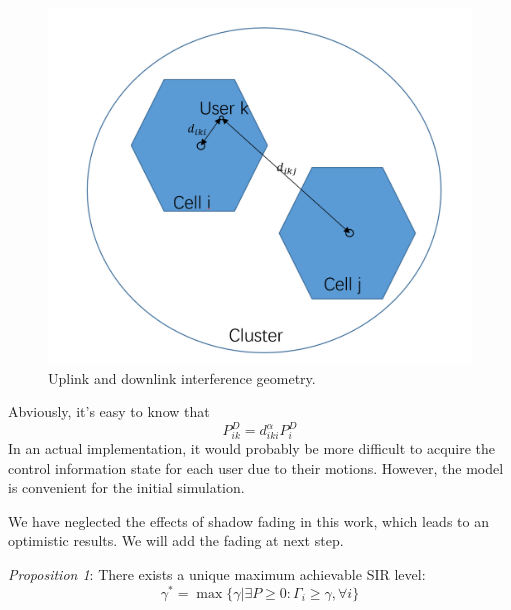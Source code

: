 \documentclass[conference]{IEEEtran}
\begin{document}
\begin{figure}[th]
	\centering
	\includegraphics[scale=0.25]{geomatrix}
	\caption{Uplink and downlink interference geometry.}
	\label{fig:geomatrix}
\end{figure}


Abviously, it's easy to know that
\begin{equation}
P^{D}_{ik} = d^\alpha_{iki}P_i^D
\end{equation}
In an actual implementation, it would probably be more difficult to acquire the control information state for each user due to their motions. However, the model is convenient for the initial simulation.

We have neglected the effects of shadow fading in this work, which leads to an optimistic results. We will add the fading at next step.

\textit{Proposition 1}: There exists a unique maximum achievable SIR level:
\begin{equation}
 \gamma^{*} = \max\{\gamma | \exists P\geq 0 : \Gamma_i \geq \gamma, \forall i \}
\end{equation}

\end{document}
